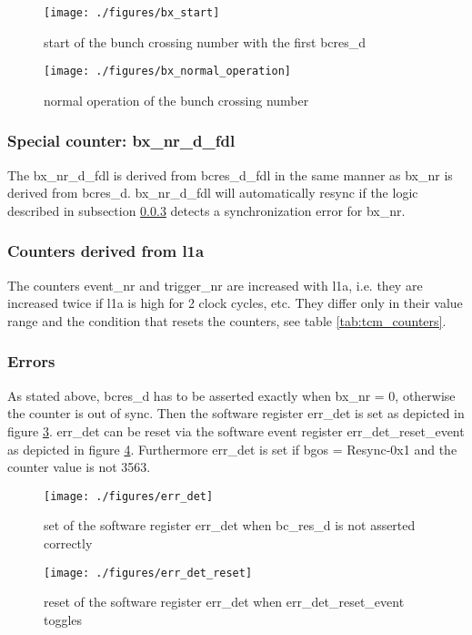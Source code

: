 \begin{figure}[ht]
  \texttt{[image: ./figures/bx\_start]}
  \caption{start of the bunch crossing number with the first bcres\_d}
  \label{fig:bx_start}
\end{figure}

\begin{figure}[ht]
  \texttt{[image: ./figures/bx\_normal\_operation]}
  \caption{normal operation of the bunch crossing number}
  \label{fig:bx_normal_operation}
\end{figure}

\subsubsection{Special counter: bx\_nr\_d\_fdl}
The bx\_nr\_d\_fdl is derived from bcres\_d\_fdl in the same manner as bx\_nr is derived from bcres\_d. bx\_nr\_d\_fdl will automatically resync if the logic described in subsection \ref{subsec:tcmerrors} detects a synchronization error for bx\_nr.

\subsubsection{Counters derived from l1a}
The counters event\_nr and trigger\_nr are increased with l1a, i.e. they are increased twice if l1a is high for 2 clock cycles, etc. They differ only in their value range and the condition that resets the counters, see table \ref{tab:tcm_counters}.

\subsubsection{Errors}\label{subsec:tcmerrors}
As stated above, bcres\_d has to be asserted exactly when bx\_nr = 0, otherwise the counter is out of sync. Then the software register err\_det is set as depicted in figure \ref{fig:err_det}. err\_det can be reset via the software event register err\_det\_reset\_event as depicted in figure \ref{fig:err_det_reset}. Furthermore err\_det is set if bgos = Resync-0x1 and the counter value is not 3563.

\begin{figure}[ht]
  \texttt{[image: ./figures/err\_det]}
  \caption{set of the software register err\_det when bc\_res\_d is not asserted correctly}
  \label{fig:err_det}
\end{figure}

\begin{figure}[ht]
  \texttt{[image: ./figures/err\_det\_reset]}
  \caption{reset of the software register err\_det when err\_det\_reset\_event toggles}
  \label{fig:err_det_reset}
\end{figure}

